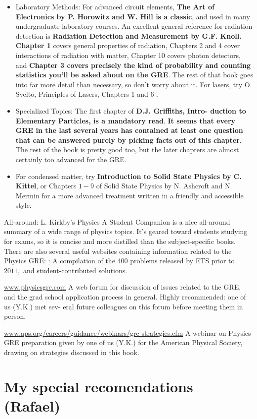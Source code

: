 \begin{itemize}
\item Laboratory Methods: For advanced circuit elements,  {\bf The Art of Electronics by P. Horowitz and W. Hill is a classic}, and used in many undergraduate laboratory courses. An
excellent general reference for radiation detection is  {\bf Radiation Detection and Measurement by G.F. Knoll. Chapter 1 } covers general properties of radiation, Chapters 2 and 4 cover interactions of radiation with matter, Chapter 10 covers photon detectors, and  {\bf Chapter 3 covers precisely the kind of probability and counting statistics you'll be asked about on the GRE}. The rest of that book goes into far more detail than necessary, so don't worry about it. For lasers, try
O. Svelto, Principles of Lasers, Chapters 1 and 6 .


\item Specialized Topics: The first chapter of  {\bf D.J. Griffiths, Intro-
duction to Elementary Particles, is a mandatory read}.  {\bf It seems that every GRE in the last several years has contained at least one question that can be answered purely by picking facts out of this chapter}. The rest of the book is pretty good too, but the later chapters are almost certainly too advanced for the GRE. 

\item For condensed matter, try  {\bf Introduction to Solid State Physics by C. Kittel}, or Chapters $1-9$ of Solid State Physics by N. Ashcroft and N. Mermin for a more advanced treatment written in a friendly and accessible style.


\end{itemize}

All-around: L. Kirkby's Physics A Student Companion is a
nice all-around summary of a wide range of physics topics.
It's geared toward students studying for exams, so it is
concise and more distilled than the subject-specific books.
There are also several useful websites containing information related to the Physics GRE:
\hyperlink{www.grephysics.net}: A compilation of the 400 problems released by ETS prior to $2011,$ and student-contributed
solutions.


\hyperlink{Link}{www.physicsgre.com} A web forum for discussion of issues related to the GRE, and the grad school application process
in general. Highly recommended: one of us (Y.K.) met sev-
eral future colleagues on this forum before meeting them in
person.


\hyperlink{Link}{www.aps.org/careers/guidance/webinars/gre-strategies.cfm}
A webinar on Physics GRE preparation given by one of us (Y.K.) for the American Physical Society, drawing on strategies discussed in this book.
\section{My special recomendations (Rafael)}